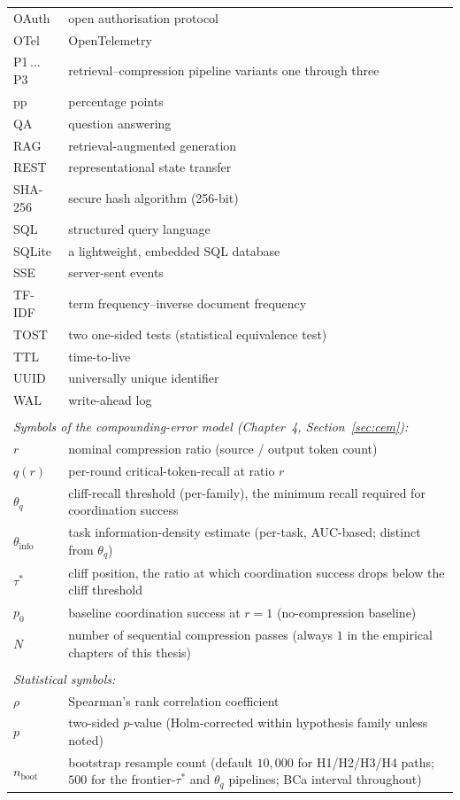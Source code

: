\begin{longtable}[l]{p{3cm}p{}}
    OAuth & open authorisation protocol \\
    OTel & OpenTelemetry \\
    P1\,$\dots$\,P3 & retrieval--compression pipeline variants one through three \\
    pp & percentage points \\
    QA & question answering \\
    RAG & retrieval-augmented generation \\
    REST & representational state transfer \\
    SHA-256 & secure hash algorithm (256-bit) \\
    SQL & structured query language \\
    SQLite & a lightweight, embedded SQL database \\
    SSE & server-sent events \\
    TF-IDF & term frequency--inverse document frequency \\
    TOST & two one-sided tests (statistical equivalence test) \\
    TTL & time-to-live \\
    UUID & universally unique identifier \\
    WAL & write-ahead log \\
    \\
    \multicolumn{2}{l}{\emph{Symbols of the compounding-error model
                            (Chapter~4, Section~\ref{sec:cem}):}} \\[2pt]
    $r$        & nominal compression ratio (source / output token count) \\
    $q(r)$     & per-round critical-token-recall at ratio $r$ \\
    $\theta_q$ & cliff-recall threshold (per-family), the minimum
                  recall required for coordination success \\
    $\theta_\text{info}$ & task information-density estimate
                  (per-task, AUC-based; distinct from $\theta_q$) \\
    $\tau^{*}$ & cliff position, the ratio at which coordination
                  success drops below the cliff threshold \\
    $p_0$      & baseline coordination success at $r=1$
                  (no-compression baseline) \\
    $N$        & number of sequential compression passes (always $1$
                  in the empirical chapters of this thesis) \\
    \\
    \multicolumn{2}{l}{\emph{Statistical symbols:}} \\[2pt]
    $\rho$         & Spearman's rank correlation coefficient \\
    $p$            & two-sided $p$-value (Holm-corrected within hypothesis family unless noted) \\
    $n_\text{boot}$ & bootstrap resample count (default $10{,}000$ for H1/H2/H3/H4 paths; $500$ for the frontier-$\tau^{*}$ and $\theta_q$ pipelines; BCa interval throughout) \\

\end{longtable}
\setcounter{table}{0}
